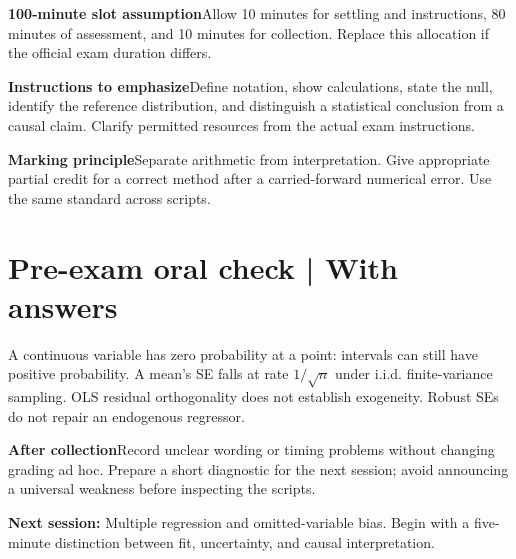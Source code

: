 \documentclass[11pt,a4paper]{article}
\newcommand{\heading}[1]{\section*{\color{accent}#1}}
\newcommand{\cue}[2]{\par\noindent\textbf{#1}\quad #2\par}
\begin{document}
\cue{100-minute slot assumption}{Allow 10 minutes for settling and instructions, 80 minutes of assessment, and 10 minutes for collection. Replace this allocation if the official exam duration differs.}
\cue{Instructions to emphasize}{Define notation, show calculations, state the null, identify the reference distribution, and distinguish a statistical conclusion from a causal claim. Clarify permitted resources from the actual exam instructions.}
\cue{Marking principle}{Separate arithmetic from interpretation. Give appropriate partial credit for a correct method after a carried-forward numerical error. Use the same standard across scripts.}
\heading{Pre-exam oral check | With answers}
A continuous variable has zero probability at a point: intervals can still have positive probability. A mean's SE falls at rate $1/\sqrt n$ under i.i.d. finite-variance sampling. OLS residual orthogonality does not establish exogeneity. Robust SEs do not repair an endogenous regressor.
\cue{After collection}{Record unclear wording or timing problems without changing grading ad hoc. Prepare a short diagnostic for the next session; avoid announcing a universal weakness before inspecting the scripts.}
\textbf{Next session:} Multiple regression and omitted-variable bias. Begin with a five-minute distinction between fit, uncertainty, and causal interpretation.
\end{document}
